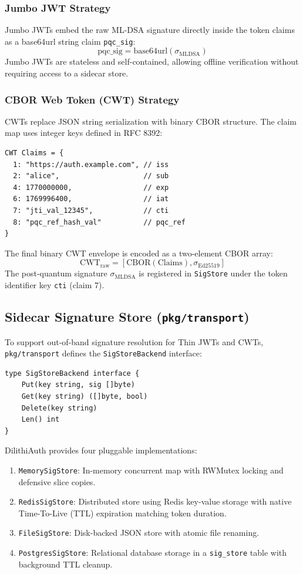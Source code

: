 \documentclass{article}
\begin{document}
\begin{IEEEkeywords}
\subsubsection{Jumbo JWT Strategy}
Jumbo JWTs embed the raw ML-DSA signature directly inside the token claims as a base64url string claim \texttt{pqc\_sig}:
\begin{equation}
\text{pqc\_sig} = \text{base64url}(\sigma_{\text{MLDSA}})
\end{equation}
Jumbo JWTs are stateless and self-contained, allowing offline verification without requiring access to a sidecar store.

\subsubsection{CBOR Web Token (CWT) Strategy}
CWTs replace JSON string serialization with binary CBOR structure. The claim map uses integer keys defined in RFC 8392:
\begin{verbatim}
CWT Claims = {
  1: "https://auth.example.com", // iss
  2: "alice",                    // sub
  4: 1770000000,                 // exp
  6: 1769996400,                 // iat
  7: "jti_val_12345",            // cti
  8: "pqc_ref_hash_val"          // pqc_ref
}
\end{verbatim}
The final binary CWT envelope is encoded as a two-element CBOR array:
\begin{equation}
\text{CWT}_{\text{raw}} = \left[ \text{CBOR}(\text{Claims}), \sigma_{\text{Ed25519}} \right]
\end{equation}
The post-quantum signature $\sigma_{\text{MLDSA}}$ is registered in \texttt{SigStore} under the token identifier key \texttt{cti} (claim 7).

\subsection{Sidecar Signature Store (\texttt{pkg/transport})}
To support out-of-band signature resolution for Thin JWTs and CWTs, \texttt{pkg/transport} defines the \texttt{SigStoreBackend} interface:
\begin{verbatim}
type SigStoreBackend interface {
    Put(key string, sig []byte)
    Get(key string) ([]byte, bool)
    Delete(key string)
    Len() int
}
\end{verbatim}
DilithiAuth provides four pluggable implementations:
\begin{enumerate}
    \item \texttt{MemorySigStore}: In-memory concurrent map with RWMutex locking and defensive slice copies.
    \item \texttt{RedisSigStore}: Distributed store using Redis key-value storage with native Time-To-Live (TTL) expiration matching token duration.
    \item \texttt{FileSigStore}: Disk-backed JSON store with atomic file renaming.
    \item \texttt{PostgresSigStore}: Relational database storage in a \texttt{sig\_store} table with background TTL cleanup.
\end{enumerate}


\end{IEEEkeywords}
\end{document}
